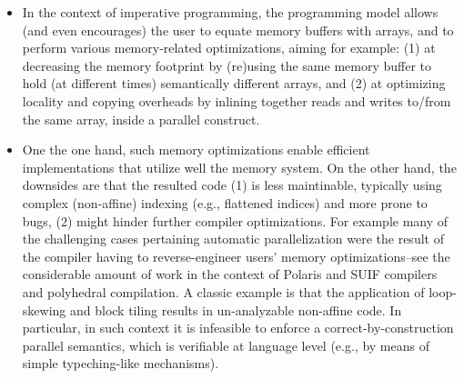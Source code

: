\documentclass[conference]{IEEEtran}
\begin{document}
\begin{itemize}
\item In the context of imperative programming, the programming
        model allows (and even encourages) the user to equate
        memory buffers with arrays, and to perform various
        memory-related optimizations, aiming for example:
        (1) at decreasing the memory footprint by (re)using the same
            memory buffer to hold (at different times) semantically
            different arrays, and
        (2) at optimizing locality and copying overheads by
            inlining together reads and writes to/from the same array,
            inside a parallel construct.

\item One the one hand, such memory optimizations enable efficient
       implementations that utilize well the memory system. On the
       other hand, the downsides are that the resulted code
        (1) is less maintinable, typically using complex (non-affine)
            indexing (e.g., flattened indices) and more prone to bugs,
        (2) might hinder further compiler optimizations. For example
            many of the challenging cases pertaining automatic
            parallelization were the result of the compiler having to
            reverse-engineer users' memory optimizations--see the
            considerable amount of work in the context of Polaris and
            SUIF compilers and polyhedral compilation. A classic example
            is that the application of loop-skewing and block tiling
            results in un-analyzable non-affine code.
    In particular, in such context it is infeasible to enforce
    a correct-by-construction parallel semantics, which is verifiable
    at language level (e.g., by means of simple typeching-like mechanisms).


\end{itemize}
\end{document}
